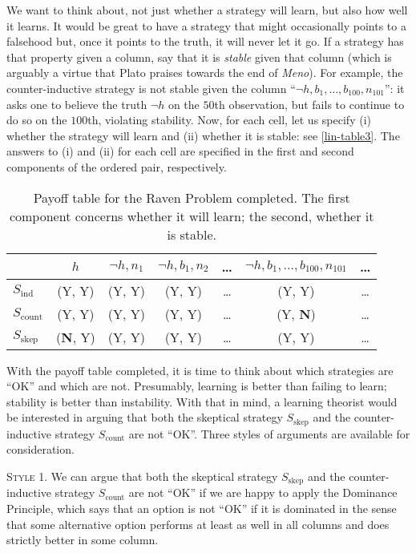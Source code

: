 We want to think about, not just whether a strategy will learn, but also how well it learns. It would be great to have a strategy that might occasionally points to a falsehood but, once it points to the truth, it will never let it go. If a strategy has that property given a column, say that it is {\em stable} given that column (which is arguably a virtue that Plato praises towards the end of {\em Meno}). For example, the counter-inductive strategy is not stable given the column ``$\neg h, b_1, \dots, b_100, n_101$'': it asks one to believe the truth $\neg h$ on the $50$th observation, but fails to continue to do so on the $100$th, violating stability. Now, for each cell, let us specify (i) whether the strategy will learn and (ii) whether it is stable: see \autoref{lin-table3}. The answers to (i) and (ii) for each cell are specified in the first and second components of the ordered pair, respectively.
\begin{table}[ht]
\centering
\begin{tabular}{lcccccc}
	& $h$ & $\neg h, n_1$ & $\neg h, b_1, n_2$ & \ldots & $\neg h, b_1, \ldots, b_{100}, n_{101}$ & \ldots \\
	\hline\hline
	$S_{\textrm{ind}}$ & (Y, Y) & (Y, Y) & (Y, Y) & \ldots & (Y, Y) & \ldots \\
  	$S_{\textrm{count}}$ & (Y, Y) & (Y, Y) & (Y, Y) & \ldots & (Y, \textbf{N}) & \ldots \\
  	$S_{\textrm{skep}}$ & (\textbf{N}, Y) & (Y, Y) & (Y, Y) & \ldots & (Y, Y) & \ldots 
\end{tabular}
\caption{Payoff table for the Raven Problem completed. The first component concerns whether it will learn; the second, whether it is stable.}\label{lin-table3}
\end{table}


With the payoff table completed, it is time to think about which strategies are ``OK'' and which are not. Presumably, learning is better than failing to learn; stability is better than instability. With that in mind, a learning theorist would be interested in arguing that both the skeptical strategy $S_{\textrm{skep}}$ and the counter-inductive strategy $S_{\textrm{count}}$ are not ``OK''. Three styles of arguments are available for consideration. 

\textsc{Style 1.} We can argue that both the skeptical strategy $S_{\textrm{skep}}$ and the counter-inductive strategy $S_{\textrm{count}}$ are not ``OK'' if we are happy to apply the Dominance Principle, which says that an option is not ``OK'' if it is dominated in the sense that some alternative option performs at least as well in all columns and does strictly better in some column. 

